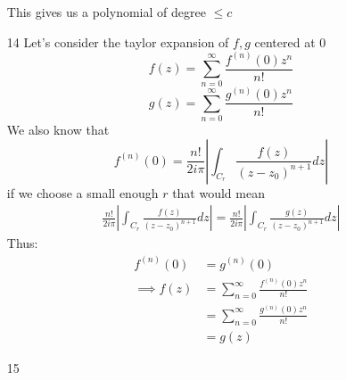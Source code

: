 \documentclass{article}
\begin{document}
\begin{enumerate}
      This gives us a polynomial of degree $\leq c$
    \item[14]
      Let's consider the taylor expansion of $f,g$ centered at 0
      \[
        f(z)=\sum_{n=0}^\infty\frac{f^{(n)}(0)z^n}{n!}
      \]\[
        g(z)=\sum_{n=0}^\infty\frac{g^{(n)}(0)z^n}{n!}
      \]
      We also know that
      \[f^{(n)}(0)=\frac{n!}{2i\pi}\left|\int_{C_r}\frac{f(z)}{(z-z_0)^{n+1}}dz\right|\]
      if we choose a small enough $r$ that would mean
      \begin{align*}
        \frac{n!}{2i\pi}\left|\int_{C_r}\frac{f(z)}{(z-z_0)^{n+1}}dz\right|=\frac{n!}{2i\pi}\left|\int_{C_r}\frac{g(z)}{(z-z_0)^{n+1}}dz\right|
      \end{align*}
      Thus:
      \begin{align*}
        f^{(n)}(0)&=g^{(n)}(0)\\
        \implies f(z)&=\sum_{n=0}^\infty\frac{f^{(n)}(0)z^n}{n!}\\
        &=\sum_{n=0}^\infty\frac{g^{(n)}(0)z^n}{n!}\\
        &=g(z)
      \end{align*}
    \item[15]

  \end{enumerate}
\end{document}
